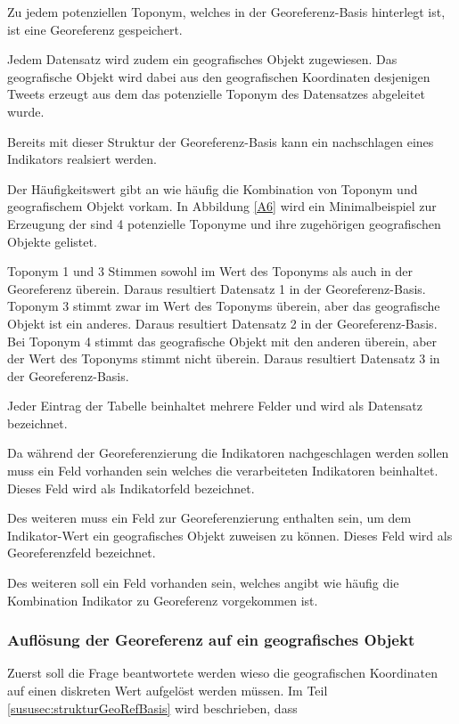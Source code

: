 					Zu jedem potenziellen Toponym, welches in der Georeferenz-Basis hinterlegt ist, ist eine Georeferenz gespeichert.

					
					
					Jedem Datensatz wird zudem ein geografisches Objekt zugewiesen.
					Das geografische Objekt wird dabei aus den geografischen Koordinaten desjenigen Tweets erzeugt aus dem das potenzielle Toponym des Datensatzes abgeleitet wurde.

					Bereits mit dieser Struktur der Georeferenz-Basis kann ein nachschlagen eines Indikators realsiert werden. 


					Der Häufigkeitswert gibt an wie häufig die Kombination von Toponym und geografischem Objekt vorkam. 
					In Abbildung \ref{A6} wird ein Minimalbeispiel zur Erzeugung der 
					sind 4 potenzielle Toponyme und ihre zugehörigen geografischen Objekte gelistet.
					
					Toponym 1 und 3 Stimmen sowohl im Wert des Toponyms als auch in der Georeferenz überein. 
					Daraus resultiert Datensatz 1 in der Georeferenz-Basis. 
					Toponym 3 stimmt zwar im Wert des Toponyms überein, aber das geografische Objekt ist ein anderes. 
					Daraus resultiert Datensatz 2 in der Georeferenz-Basis.
					Bei Toponym 4 stimmt das geografische Objekt mit den anderen überein, aber der Wert des Toponyms stimmt nicht überein.
					Daraus resultiert Datensatz 3 in der Georeferenz-Basis.


					Jeder Eintrag der Tabelle beinhaltet mehrere Felder und wird als Datensatz bezeichnet.

					Da während der Georeferenzierung die Indikatoren nachgeschlagen werden sollen muss ein Feld vorhanden sein welches die verarbeiteten Indikatoren beinhaltet.
					Dieses Feld wird als Indikatorfeld bezeichnet. 

					Des weiteren muss ein Feld zur Georeferenzierung enthalten sein, um dem Indikator-Wert ein geografisches Objekt zuweisen zu können. 
					Dieses Feld wird als Georeferenzfeld bezeichnet. 

					Des weiteren soll ein Feld vorhanden sein, welches angibt wie häufig die Kombination Indikator zu Georeferenz vorgekommen ist. 


				\subsubsection{Auflösung der Georeferenz auf ein geografisches Objekt}

				Zuerst soll die Frage beantwortete werden wieso die geografischen Koordinaten auf einen diskreten Wert aufgelöst werden müssen. 
				Im Teil \ref{sususec:strukturGeoRefBasis} wird beschrieben, dass 

